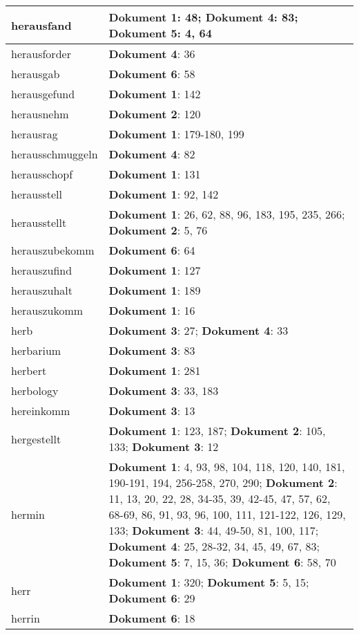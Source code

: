 \documentclass[a5paper]{article}
\begin{document}
\begin{longtable}[l]{|l|p{3in}|}
\hline
herausfand & \textbf{Dokument 1}: 48; \textbf{Dokument 4}: 83; \textbf{Dokument 5}: 4, 64 \\
\hline
herausforder & \textbf{Dokument 4}: 36 \\
\hline
herausgab & \textbf{Dokument 6}: 58 \\
\hline
herausgefund & \textbf{Dokument 1}: 142 \\
\hline
herausnehm & \textbf{Dokument 2}: 120 \\
\hline
herausrag & \textbf{Dokument 1}: 179-180, 199 \\
\hline
herausschmuggeln & \textbf{Dokument 4}: 82 \\
\hline
herausschopf & \textbf{Dokument 1}: 131 \\
\hline
herausstell & \textbf{Dokument 1}: 92, 142 \\
\hline
herausstellt & \textbf{Dokument 1}: 26, 62, 88, 96, 183, 195, 235, 266; \textbf{Dokument 2}: 5, 76 \\
\hline
herauszubekomm & \textbf{Dokument 6}: 64 \\
\hline
herauszufind & \textbf{Dokument 1}: 127 \\
\hline
herauszuhalt & \textbf{Dokument 1}: 189 \\
\hline
herauszukomm & \textbf{Dokument 1}: 16 \\
\hline
herb & \textbf{Dokument 3}: 27; \textbf{Dokument 4}: 33 \\
\hline
herbarium & \textbf{Dokument 3}: 83 \\
\hline
herbert & \textbf{Dokument 1}: 281 \\
\hline
herbology & \textbf{Dokument 3}: 33, 183 \\
\hline
hereinkomm & \textbf{Dokument 3}: 13 \\
\hline
hergestellt & \textbf{Dokument 1}: 123, 187; \textbf{Dokument 2}: 105, 133; \textbf{Dokument 3}: 12 \\
\hline
hermin & \textbf{Dokument 1}: 4, 93, 98, 104, 118, 120, 140, 181, 190-191, 194, 256-258, 270, 290; \textbf{Dokument 2}: 11, 13, 20, 22, 28, 34-35, 39, 42-45, 47, 57, 62, 68-69, 86, 91, 93, 96, 100, 111, 121-122, 126, 129, 133; \textbf{Dokument 3}: 44, 49-50, 81, 100, 117; \textbf{Dokument 4}: 25, 28-32, 34, 45, 49, 67, 83; \textbf{Dokument 5}: 7, 15, 36; \textbf{Dokument 6}: 58, 70 \\
\hline
herr & \textbf{Dokument 1}: 320; \textbf{Dokument 5}: 5, 15; \textbf{Dokument 6}: 29 \\
\hline
herrin & \textbf{Dokument 6}: 18 \\

\end{longtable}
\end{document}
